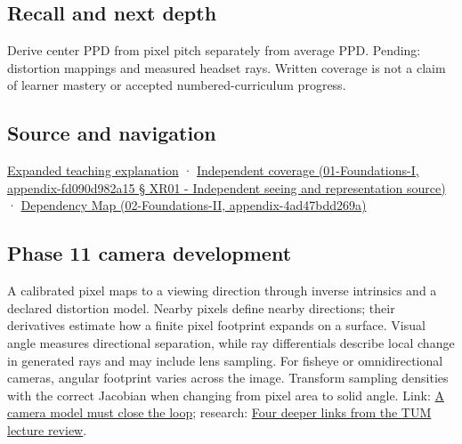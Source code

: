 \subsection{Recall and next depth}\label{recall-and-next-depth}

Derive center PPD from pixel pitch separately from average PPD. Pending: distortion mappings and measured headset rays. Written coverage is not a claim of learner mastery or accepted numbered-curriculum progress.

\subsection{Source and navigation}\label{source-and-navigation}

\href{Continuous\%20Notes/University\%20-\%20Worlds,\%20Images\%20and\%20Inference\%20-\%20Graphics,\%20Vision\%20and\%20Photography\#Angles\%20connect\%20display\%20samples\%20to\%20a\%20viewer}{Expanded teaching explanation} · \href{}{Independent coverage (01-Foundations-I, appendix-fd090d982a15 § XR01 - Independent seeing and representation source)} · \href{}{Dependency Map (02-Foundations-II, appendix-4ad47bdd269a)}

\subsection{Phase 11 camera development}\label{phase-11-camera-development}

A calibrated pixel maps to a viewing direction through inverse intrinsics and a declared distortion model. Nearby pixels define nearby directions; their derivatives estimate how a finite pixel footprint expands on a surface. Visual angle measures directional separation, while ray differentials describe local change in generated rays and may include lens sampling. For fisheye or omnidirectional cameras, angular footprint varies across the image. Transform sampling densities with the correct Jacobian when changing from pixel area to solid angle. Link: \href{Continuous\%20Notes/Computing\%20Foundations\%20-\%20From\%20Bits\%20to\%20C++\%20and\%20Systems\%20APIs\#A\%20camera\%20model\%20must\%20close\%20the\%20loop}{A camera model must close the loop}; research: \href{Continuous\%20Notes/Computing\%20Foundations\%20-\%20From\%20Bits\%20to\%20C++\%20and\%20Systems\%20APIs\#Four\%20deeper\%20links\%20from\%20the\%20TUM\%20lecture\%20review}{Four deeper links from the TUM lecture review}.
